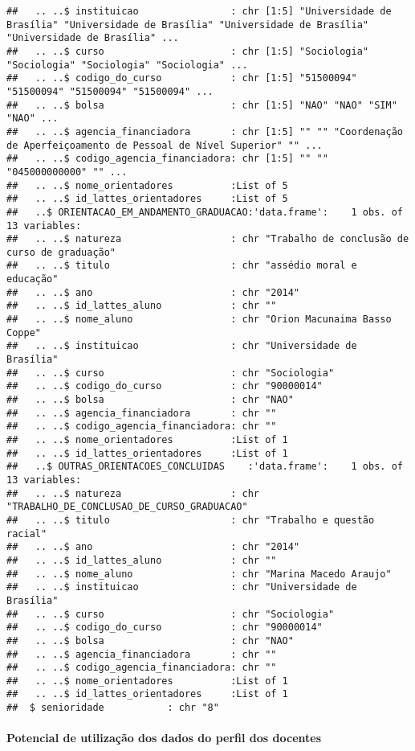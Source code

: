 \documentclass[]{article}
\let\oldparagraph\paragraph
\renewcommand{\paragraph}[1]{\oldparagraph{#1}\mbox{}}
\begin{document}
\begin{verbatim}
##   .. ..$ instituicao                : chr [1:5] "Universidade de Brasília" "Universidade de Brasília" "Universidade de Brasília" "Universidade de Brasília" ...
##   .. ..$ curso                      : chr [1:5] "Sociologia" "Sociologia" "Sociologia" "Sociologia" ...
##   .. ..$ codigo_do_curso            : chr [1:5] "51500094" "51500094" "51500094" "51500094" ...
##   .. ..$ bolsa                      : chr [1:5] "NAO" "NAO" "SIM" "NAO" ...
##   .. ..$ agencia_financiadora       : chr [1:5] "" "" "Coordenação de Aperfeiçoamento de Pessoal de Nível Superior" "" ...
##   .. ..$ codigo_agencia_financiadora: chr [1:5] "" "" "045000000000" "" ...
##   .. ..$ nome_orientadores          :List of 5
##   .. ..$ id_lattes_orientadores     :List of 5
##   ..$ ORIENTACAO_EM_ANDAMENTO_GRADUACAO:'data.frame':    1 obs. of  13 variables:
##   .. ..$ natureza                   : chr "Trabalho de conclusão de curso de graduação"
##   .. ..$ titulo                     : chr "assédio moral e educação"
##   .. ..$ ano                        : chr "2014"
##   .. ..$ id_lattes_aluno            : chr ""
##   .. ..$ nome_aluno                 : chr "Orion Macunaima Basso Coppe"
##   .. ..$ instituicao                : chr "Universidade de Brasília"
##   .. ..$ curso                      : chr "Sociologia"
##   .. ..$ codigo_do_curso            : chr "90000014"
##   .. ..$ bolsa                      : chr "NAO"
##   .. ..$ agencia_financiadora       : chr ""
##   .. ..$ codigo_agencia_financiadora: chr ""
##   .. ..$ nome_orientadores          :List of 1
##   .. ..$ id_lattes_orientadores     :List of 1
##   ..$ OUTRAS_ORIENTACOES_CONCLUIDAS    :'data.frame':    1 obs. of  13 variables:
##   .. ..$ natureza                   : chr "TRABALHO_DE_CONCLUSAO_DE_CURSO_GRADUACAO"
##   .. ..$ titulo                     : chr "Trabalho e questão racial"
##   .. ..$ ano                        : chr "2014"
##   .. ..$ id_lattes_aluno            : chr ""
##   .. ..$ nome_aluno                 : chr "Marina Macedo Araujo"
##   .. ..$ instituicao                : chr "Universidade de Brasília"
##   .. ..$ curso                      : chr "Sociologia"
##   .. ..$ codigo_do_curso            : chr "90000014"
##   .. ..$ bolsa                      : chr "NAO"
##   .. ..$ agencia_financiadora       : chr ""
##   .. ..$ codigo_agencia_financiadora: chr ""
##   .. ..$ nome_orientadores          :List of 1
##   .. ..$ id_lattes_orientadores     :List of 1
##  $ senioridade           : chr "8"
\end{verbatim}

\paragraph{Potencial de utilização dos dados do perfil dos
docentes}\label{potencial-de-utilizacao-dos-dados-do-perfil-dos-docentes}
\end{document}
